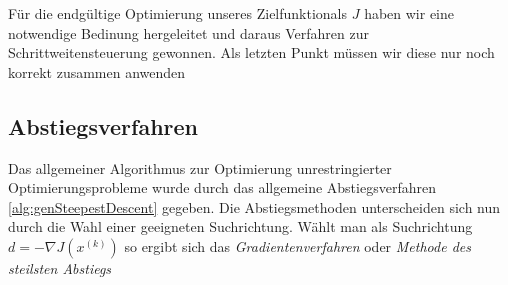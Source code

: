 Für die endgültige Optimierung unseres Zielfunktionals $J$ haben wir eine notwendige Bedinung hergeleitet und daraus Verfahren zur Schrittweitensteuerung gewonnen. Als letzten Punkt müssen wir diese nur noch korrekt zusammen anwenden
\subsection{Abstiegsverfahren}
Das allgemeiner Algorithmus zur Optimierung unrestringierter Optimierungsprobleme wurde durch das allgemeine Abstiegsverfahren  \ref{alg:genSteepestDescent} gegeben. Die Abstiegsmethoden unterscheiden sich nun durch die Wahl einer geeigneten Suchrichtung. 
Wählt man als Suchrichtung $d = -\nabla J(x^{(k)})$ so ergibt sich das \textit{Gradientenverfahren} oder \textit{Methode des steilsten Abstiegs}

